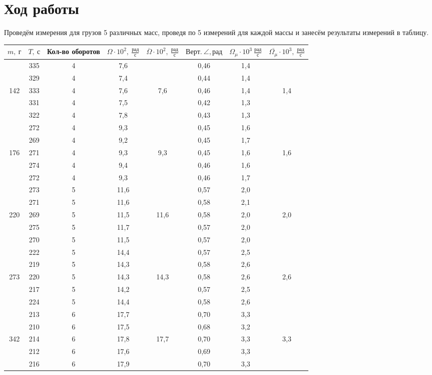 \documentclass[a4paper, 12pt]{article}
\begin{document}
	\section*{Ход работы}
		\thispagestyle{empty}
		Проведём измерения для грузов 5 различных масс, проведя по 5 измерений для каждой массы и занесём результаты измерений в таблицу.
		\begin{longtable}[H]{|c|c|c|c|c||c|c|c|}
			\hline
			$m,\: г$ & $T,\: с$ & Кол-во оборотов & $\Omega \cdot 10^{2},\: \frac{рад}{с} $ & $\overline{\Omega} \cdot 10^{2},\: \frac{рад}{с}$ & $Верт.\: \angle, рад$ & $\Omega_{\mu} \cdot 10^3\: \frac{рад}{с}$ & $\overline{\Omega_{\mu}} \cdot 10^{3},\: \frac{рад}{с}$ \\
			\hline
			& 335 & 4 & 7,6 &  & 0,46 & 1,4 &  \\
			& 329 & 4 & 7,4 &  & 0,44 & 1,4 &  \\
			142 & 333 & 4 & 7,6 & 7,6 & 0,46 & 1,4 & 1,4 \\
			& 331 & 4 & 7,5 &  & 0,42 & 1,3 &  \\
			& 322 & 4 & 7,8 &  & 0,43 & 1,3 &  \\
			\hline
			& 272 & 4 & 9,3 &  & 0,45 & 1,6 &  \\
			& 269 & 4 & 9,2 &  & 0,45 & 1,7 &  \\
			176 & 271 & 4 & 9,3 & 9,3 & 0,45 & 1,6 & 1,6 \\
			& 274 & 4 & 9,4 &  & 0,46 & 1,6 &  \\
			& 272 & 4 & 9,3 &  & 0,46 & 1,7 &  \\
			\hline
			& 273 & 5 & 11,6 &  & 0,57 & 2,0 &  \\
			& 271 & 5 & 11,6 &  & 0,58 & 2,1 &  \\
			220 & 269 & 5 & 11,5 & 11,6 & 0,58 & 2,0 & 2,0 \\
			& 275 & 5 & 11,7 &  & 0,57 & 2,0 &  \\
			& 270 & 5 & 11,5 &  & 0,57 & 2,0 &  \\
			\hline
			& 222 & 5 & 14,4 &  & 0,57 & 2,5 &  \\
			& 219 & 5 & 14,3 &  & 0,58 & 2,6 &  \\
			273 & 220 & 5 & 14,3 & 14,3 & 0,58 & 2,6 & 2,6 \\
			& 217 & 5 & 14,2 &  & 0,57 & 2,5 &  \\
			& 224 & 5 & 14,4 &  & 0,58 & 2,6 &  \\
			\hline
			& 213 & 6 & 17,7 &  & 0,70 & 3,3 &  \\
			& 210 & 6 & 17,5 &  & 0,68 & 3,2 &  \\
			342 & 214 & 6 & 17,8 & 17,7 & 0,70 & 3,3 & 3,3 \\
			& 212 & 6 & 17,6 &  & 0,69 & 3,3 &  \\
			& 216 & 6 & 17,9 &  & 0,70 & 3,3 &  \\
			\hline
		\end{longtable}
\end{document}
